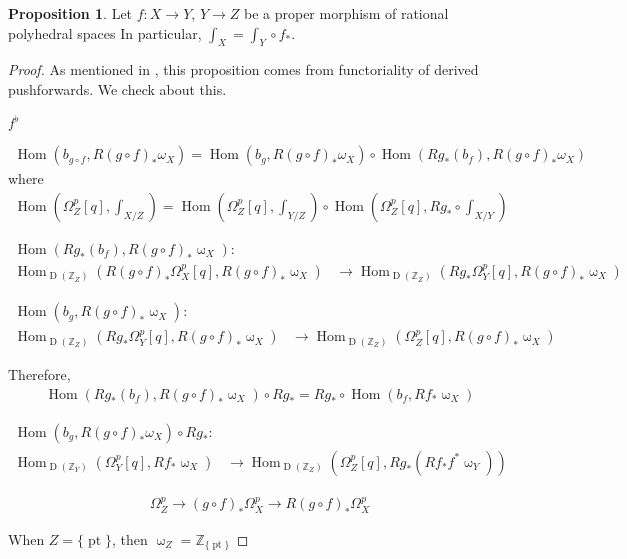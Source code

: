 \documentclass[a4paper,dvipdfmx,reqno,12pt]{amsart}
\theoremstyle{definition}
\newtheorem{Prop}[Thm]{Proposition}
\newcommand{\Z}{\mathbb{Z}}%
\newcommand{\opn}[1]{\operatorname{#1}}
\numberwithin{equation}{section}
\begin{document}
\begin{Prop}
  Let $f:X\to Y$, $Y\to Z$ be a proper morphism of rational polyhedral spaces
  In particular, $\int_X=\int_Y\circ f_*$.
\end{Prop}
\begin{proof}
  As mentioned in \cite[4.4]{gross2019sheaftheoretic}, this proposition comes from functoriality of derived pushforwards.
  We check about this.

  $f^{\flat}$

  \begin{align}
    \opn{Hom}(b_{g\circ f},R(g\circ f)_*\omega_X)
    =\opn{Hom}(b_g,R(g\circ f)_*\omega_X)\circ\opn{Hom}(Rg_*(b_f),R(g\circ f)_*\omega_X)
  \end{align}
  where
  \begin{align}
    \opn{Hom}(\Omega_{Z}^{p}[q],\int_{X/Z})=
    \opn{Hom}(\Omega_Z^{p}[q],\int_{Y/Z})\circ \opn{Hom}(\Omega_Z^{p}[q],Rg_*\circ \int_{X/Y})
  \end{align}

  \begin{align}
    \opn{Hom}(Rg_*(b_f),R(g\circ f)_*\upomega_X): &                                                                            \\
    \opn{Hom}_{\opn{D}(\Z_Z)}(R(g\circ f)_*\Omega_X^{p}[q],R(g\circ f)_*\upomega_X)
                                                  & \to \opn{Hom}_{\opn{D}(\Z_Z)}(Rg_*\Omega_Y^{p}[q],R(g\circ f)_*\upomega_X)
  \end{align}

  \begin{align}
    \opn{Hom}(b_g,R(g\circ f)_*\upomega_X): &                                                                        \\
    \opn{Hom}_{\opn{D}(\Z_Z)}(Rg_*\Omega_Y^{p}[q],R(g\circ f)_*\upomega_X)
                                            & \to \opn{Hom}_{\opn{D}(\Z_Z)}(\Omega_Z^{p}[q],R(g\circ f)_*\upomega_X)
  \end{align}

  Therefore,
  \begin{align}
    \opn{Hom}(Rg_*(b_f),R(g\circ f)_*\upomega_X)\circ Rg_*= Rg_*\circ \opn{Hom}(b_f,Rf_*\upomega_X)
  \end{align}

  \begin{align}
    \opn{Hom}(b_{g},R(g\circ f)_*\omega_X)\circ Rg_*:                           \\
    \opn{Hom}_{\opn{D}(\Z_Y)}(\Omega_Y^{p}[q],R f_*\upomega_X)
     & \to \opn{Hom}_{\opn{D}(\Z_Z)}(\Omega_Z^{p}[q],Rg_*(Rf_*f^{*}\upomega_Y))
  \end{align}

  \begin{align}
    \Omega_Z^{p}\to (g\circ f)_*\Omega_{X}^{p}\to R(g\circ f)_*\Omega_{X}^{p}
  \end{align}

  When $Z=\{\opn{pt}\}$, then $\upomega_Z=\Z_{\{\opn{pt}\}}$
\end{proof}
\end{document}
